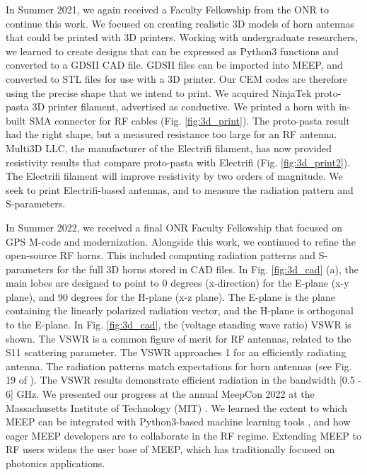 \documentclass[../../main.tex]{subfiles}
\begin{document}
In Summer 2021, we again received a Faculty Fellowship from the ONR to continue this work.  We focused on creating realistic 3D models of horn antennas that could be printed with 3D printers.  Working with undergraduate researchers, we learned to create designs that can be expressed as Python3 functions and converted to a GDSII CAD file.  GDSII files can be imported into MEEP, and converted to STL files for use with a 3D printer.  Our CEM codes are therefore using the precise shape that we intend to print.  We acquired NinjaTek proto-pasta 3D printer filament, advertised as conductive.  We printed a horn with in-built SMA connecter for RF cables (Fig. \ref{fig:3d_print}). The proto-pasta result had the right shape, but a measured resistance too large for an RF antenna.  Multi3D LLC, the manufacturer of the Electrifi filament, has now provided resistivity results that compare proto-pasta with Electrifi (Fig. \ref{fig:3d_print2}).  The Electrifi filament will improve resistivity by two orders of magnitude.  We seek to print Electrifi-based antennas, and to measure the radiation pattern and S-parameters. \\ \vspace{2.5mm}

In Summer 2022, we received a final ONR Faculty Fellowship that focused on GPS M-code and modernization.  Alongside this work, we continued to refine the open-source RF horns.  This included computing radiation patterns and S-parameters for the full 3D horns stored in CAD files.  In Fig. \ref{fig:3d_cad} (a), the main lobes are designed to point to 0 degrees (x-direction) for the E-plane (x-y plane), and 90 degrees for the H-plane (x-z plane).  The E-plane is the plane containing the linearly polarized radiation vector, and the H-plane is orthogonal to the E-plane.  In Fig. \ref{fig:3d_cad}, the (voltage standing wave ratio) VSWR is shown.  The VSWR is a common figure of merit for RF antennas, related to the S11 scattering parameter.  The VSWR approaches 1 for an efficiently radiating antenna.  The radiation patterns match expectations for horn antennas (see Fig. 19 of \cite{8786183}).  The VSWR results demonstrate efficient radiation in the bandwidth [0.5 - 6] GHz.  We presented our progress at the annual MeepCon 2022 at the Massachusetts Institute of Technology (MIT) \cite{meepcon2022}.  We learned the extent to which MEEP can be integrated with Python3-based machine learning tools \cite{meepcon2022_2}, and how eager MEEP developers are to collaborate in the RF regime.  Extending MEEP to RF users widens the user base of MEEP, which has traditionally focused on photonics applications.
\end{document}
